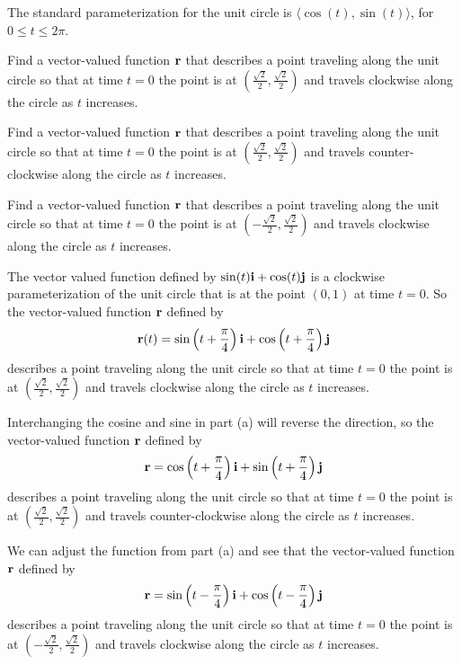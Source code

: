 \begin{exercises} 

\item \label{Ez:9.6.1}   The standard parameterization for the unit circle is $\langle \cos(t), \sin(t) \rangle$, for $0 \le t \le 2\pi$.


\ba

	\item Find a vector-valued function $\mathbf{r}$ that describes a point traveling along the unit circle so that at time $t=0$ the point is at $\left(\frac{\sqrt{2}}{2}, \frac{\sqrt{2}}{2} \right)$ and travels clockwise along the circle as $t$ increases.
	\item Find a vector-valued function $\mathbf{r}$ that describes a point traveling along the unit circle so that at time $t=0$ the point is at $\left(\frac{\sqrt{2}}{2}, \frac{\sqrt{2}}{2} \right)$ and travels counter-clockwise along the circle as $t$ increases.
	\item Find a vector-valued function $\mathbf{r}$ that describes a point traveling along the unit circle so that at time $t=0$ the point is at $\left(-\frac{\sqrt{2}}{2}, \frac{\sqrt{2}}{2} \right)$ and travels clockwise along the circle as $t$ increases.

\ea

\begin{exerciseSolution}
\ba
	\item The vector valued function defined by $\sin(t) \mathbf{i} + \cos(t) \mathbf{j}$ is a clockwise parameterization of the unit circle that is at the point $(0,1)$ at time $t=0$. So the vector-valued function $\mathbf{r}$ defined by 
\[\mathbf{r}(t) = \sin\left(t+\frac{\pi}{4}\right) \mathbf{i} + \cos\left(t+\frac{\pi}{4}\right) \mathbf{j}\]
describes a point traveling along the unit circle so that at time $t=0$ the point is at $\left(\frac{\sqrt{2}}{2}, \frac{\sqrt{2}}{2} \right)$ and travels clockwise along the circle as $t$ increases.
	\item Interchanging the cosine and sine in part (a) will reverse the direction, so the vector-valued function $\mathbf{r}$ defined by 
\[\mathbf{r} = \cos\left(t+\frac{\pi}{4}\right) \mathbf{i} + \sin\left(t+\frac{\pi}{4}\right) \mathbf{j}\]
describes a point traveling along the unit circle so that at time $t=0$ the point is at $\left(\frac{\sqrt{2}}{2}, \frac{\sqrt{2}}{2} \right)$ and travels counter-clockwise along the circle as $t$ increases.
	\item We can adjust the function from part (a) and see that the vector-valued function $\mathbf{r}$ defined by 
\[\mathbf{r} = \sin\left(t-\frac{\pi}{4}\right) \mathbf{i} + \cos\left(t-\frac{\pi}{4}\right) \mathbf{j}\]
describes a point traveling along the unit circle so that at time $t=0$ the point is at $\left(-\frac{\sqrt{2}}{2}, \frac{\sqrt{2}}{2} \right)$ and travels clockwise along the circle as $t$ increases.


\end{exerciseSolution}
\end{exercises}
